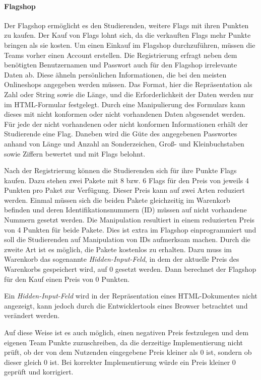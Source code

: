 \paragraph{Flagshop} \label{para:Flagshop}
Der Flagshop ermöglicht es den Studierenden, weitere Flags mit ihren Punkten zu kaufen. Der Kauf von Flags lohnt sich, da die verkauften Flags mehr Punkte bringen als sie kosten. Um einen Einkauf im Flagshop durchzuführen, müssen die Teams vorher einen Account erstellen. Die Registrierung erfragt neben dem benötigten Benutzernamen und Passwort auch für den Flagshop irrelevante Daten ab. Diese ähneln persönlichen Informationen, die bei den meisten Onlineshops angegeben werden müssen. Das Format, hier die Repräsentation als Zahl oder String sowie die Länge, und die Erforderlichkeit der Daten werden nur im HTML-Formular festgelegt. Durch eine Manipulierung des Formulars kann dieses mit nicht konformen oder nicht vorhandenen Daten abgesendet werden. Für jede der nicht vorhandenen oder nicht konformen Informationen erhält der Studierende eine Flag. Daneben wird die Güte des angegebenen Passwortes anhand von Länge und Anzahl an Sonderzeichen, Groß- und Kleinbuchstaben sowie Ziffern bewertet und mit Flags belohnt.

Nach der Registrierung können die Studierenden sich für ihre Punkte Flags kaufen. Dazu stehen zwei Pakete mit 8 bzw. 6 Flags für den Preis von jeweils 4 Punkten pro Paket zur Verfügung. Dieser Preis kann auf zwei Arten reduziert werden. 
Einmal müssen sich die beiden Pakete gleichzeitig im Warenkorb befinden und deren Identifikationsnummern (ID) müssen auf nicht vorhandene Nummern gesetzt werden. Die Manipulation resultiert in einem reduzierten Preis von 4 Punkten für beide Pakete. Dies ist extra im Flagshop einprogrammiert und soll die Studierenden auf Manipulation von IDs aufmerksam machen.
Durch die zweite Art ist es möglich, die Pakete kostenlos zu erhalten. Dazu muss im Warenkorb das sogenannte \textit{Hidden-Input-Feld}, in dem der aktuelle Preis des Warenkorbs gespeichert wird, auf 0 gesetzt werden. Dann berechnet der Flagshop für den Kauf einen Preis von 0 Punkten. \cite[S. 63]{abtsUeberarbeitungUndErweiterung2016}

Ein \textit{Hidden-Input-Feld} wird in der Repräsentation eines HTML-Dokumentes nicht angezeigt, kann jedoch durch die Entwicklertools eines Browser betrachtet und verändert werden. \cite{w3schoolsHTMLHiddenInput}

Auf diese Weise ist es auch möglich, einen negativen Preis festzulegen und dem eigenen Team Punkte zuzuschreiben, da die derzeitige Implementierung nicht prüft, ob der von dem Nutzenden eingegebene Preis kleiner als 0 ist, sondern ob dieser gleich 0 ist. Bei korrekter Implementierung würde ein Preis kleiner 0 geprüft und korrigiert.

